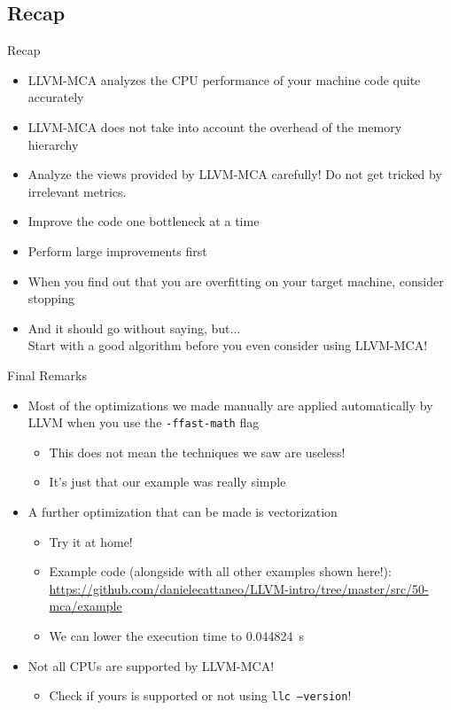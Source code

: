 
\subsection{Recap}


\begin{frame}{Recap}
\begin{itemize}
\item LLVM-MCA analyzes the CPU performance of your machine code quite accurately
\item \alert{LLVM-MCA does not take into account the overhead of the memory hierarchy}
\item Analyze the views provided by LLVM-MCA carefully! Do not get tricked by irrelevant metrics.
\item Improve the code one bottleneck at a time
\item Perform large improvements first
\item When you find out that you are overfitting on your target machine, consider stopping
\medskip
\item {\footnotesize And it should go without saying, but...}\\
	{\normalsize\alert{Start with a good algorithm before you even consider using LLVM-MCA!}}
\end{itemize}
\end{frame}


\begin{frame}{Final Remarks}
\begin{itemize}
\item Most of the optimizations we made manually are applied automatically 
by LLVM when you use the \texttt{-ffast-math} flag
	\begin{itemize}
	\item This does not mean the techniques we saw are useless!
	\item It's just that our example was really simple
	\end{itemize}
\medskip
\item A further optimization that can be made is \alert{vectorization}
	\begin{itemize}
	\item Try it at home!
	\item Example code (alongside with all other examples shown here!):\\
				\url{https://github.com/danielecattaneo/LLVM-intro/tree/master/src/50-mca/example}
	\item We can lower the execution time to \SI{0.044824}{\second}
	\end{itemize}
\medskip
\item Not all CPUs are supported by LLVM-MCA!
	\begin{itemize}
	\item Check if yours is supported or not using \texttt{llc --version}!
	\end{itemize}
\end{itemize}
\end{frame}


